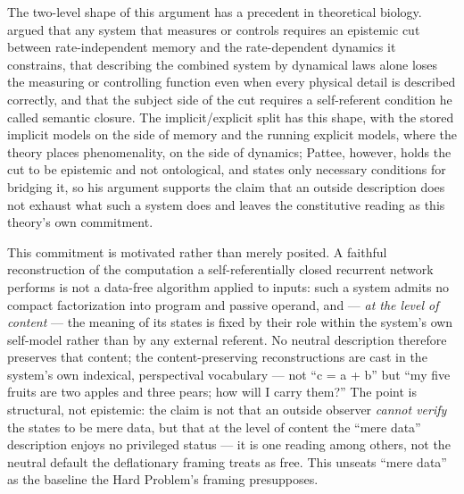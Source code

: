 \documentclass[12pt]{article}
\begin{document}
{The two-level shape of this argument has a precedent in theoretical biology. \citet{Pattee2001} argued that any system that measures or controls requires an epistemic cut between rate-independent memory and the rate-dependent dynamics it constrains, that describing the combined system by dynamical laws alone loses the measuring or controlling function even when every physical detail is described correctly, and that the subject side of the cut requires a self-referent condition he called semantic closure. The implicit/explicit split has this shape, with the stored implicit models on the side of memory and the running explicit models, where the theory places phenomenality, on the side of dynamics; Pattee, however, holds the cut to be epistemic and not ontological, and states only necessary conditions for bridging it, so his argument supports the claim that an outside description does not exhaust what such a system does and leaves the constitutive reading as this theory's own commitment.

This commitment is motivated rather than merely posited. A faithful reconstruction of the computation a self-referentially closed recurrent network performs is not a data-free algorithm applied to inputs: such a system admits no compact factorization into program and passive operand, and --- \emph{at the level of content} --- the meaning of its states is fixed by their role within the system's own self-model rather than by any external referent. No neutral description therefore preserves that content; the content-preserving reconstructions are cast in the system's own indexical, perspectival vocabulary --- not ``c = a + b'' but ``my five fruits are two apples and three pears; how will I carry them?'' The point is structural, not epistemic: the claim is not that an outside observer \emph{cannot verify} the states to be mere data, but that at the level of content the ``mere data'' description enjoys no privileged status --- it is one reading among others, not the neutral default the deflationary framing treats as free. This unseats ``mere data'' as the baseline the Hard Problem's framing presupposes.

}
\end{document}
